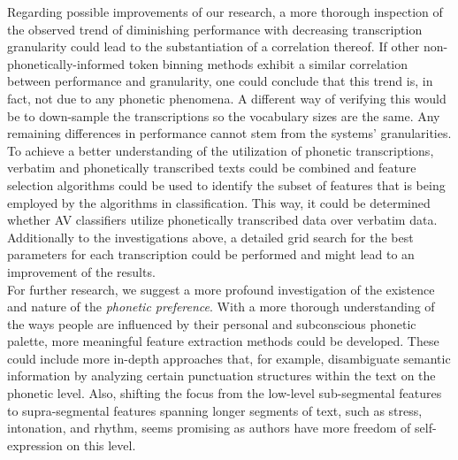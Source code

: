 Regarding possible improvements of our research, a more thorough inspection of the observed trend of diminishing performance with decreasing transcription granularity could lead to the substantiation of a correlation thereof.
If other non-phonetically-informed token binning methods exhibit a similar correlation between performance and granularity, one could conclude that this trend is, in fact, not due to any phonetic phenomena.
A different way of verifying this would be to down-sample the transcriptions so the vocabulary sizes are the same.
Any remaining differences in performance cannot stem from the systems' granularities.\\
To achieve a better understanding of the utilization of phonetic transcriptions, verbatim and phonetically transcribed texts could be combined and feature selection algorithms could be used to identify the subset of features that is being employed by the algorithms in classification.
This way, it could be determined whether AV classifiers utilize phonetically transcribed data over verbatim data.\\
Additionally to the investigations above, a detailed grid search for the best parameters for each transcription could be performed and might lead to an improvement of the results.\\
For further research, we suggest a more profound investigation of the existence and nature of the \textit{phonetic preference}.
With a more thorough understanding of the ways people are influenced by their personal and subconscious phonetic palette, more meaningful feature extraction methods could be developed.
These could include more in-depth approaches that, for example, disambiguate semantic information by analyzing certain punctuation structures within the text on the phonetic level.
Also, shifting the focus from the low-level sub-segmental features to supra-segmental features spanning longer segments of text, such as stress, intonation, and rhythm, seems promising as authors have more freedom of self-expression on this level.